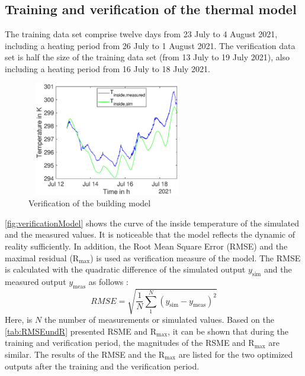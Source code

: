     \subsection{Training and verification of the thermal model}
    \label{verificationthermalmodel}
    The training data set comprise twelve days from 23 July to 4 August 2021, including a heating period from 26 July to 1 August 2021. The verification data set is half the size of the training data set (from 13 July to 19 July 2021), also including a heating period from 16 July to 18 July 2021. \newline
    \begin{figure}
            \centering
            \includegraphics[width=7cm,height=5cm]{figure/Verlauf_inside_ValidierungModell.eps}
           \caption{Verification of the building model}
           \label{fig:verificationModel}
    \end{figure}
   \autoref{fig:verificationModel} shows the curve of the inside temperature of the simulated and the measured values. It is noticeable that the model reflects the dynamic of reality sufficiently. In addition, the Root Mean Square Error (RMSE) and the maximal residual ($\mathrm{R}_\text{max}$) is used as verification measure of the model.\newline
    The RMSE is calculated with the quadratic difference of the simulated output $y_\text{sim}$ and the measured output $y_\text {meas}$ as follows \cite{Barnston.1992}: 
    \begin{equation}
        RMSE = \sqrt{\frac{1}{N} \sum \limits_1^N (y_\text{sim} - y_\text {meas})^2}
    \end{equation}
    Here, is $N$ the number of measurements or simulated values.
    Based on the \autoref{tab:RMSEundR} presented RSME and $\mathrm{R}_\text{max}$, it can be shown that during the training and verification period, the magnitudes of the RSME and $\mathrm{R}_\text{max}$ are similar. The results of the RMSE and the $\mathrm{R}_\text{max}$ are listed for the two optimized outputs after the training and the verification period.
